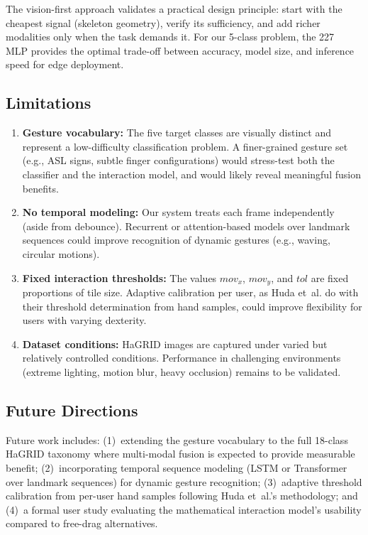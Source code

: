\documentclass[11pt,a4paper]{article}
\begin{document}
The vision-first approach validates a practical design principle: start with the cheapest signal (skeleton geometry), verify its sufficiency, and add richer modalities only when the task demands it. For our 5-class problem, the \SI{227}{\kilo\byte} MLP provides the optimal trade-off between accuracy, model size, and inference speed for edge deployment.

\subsection{Limitations}

\begin{enumerate}
    \item \textbf{Gesture vocabulary:} The five target classes are visually distinct and represent a low-difficulty classification problem. A finer-grained gesture set (e.g., ASL signs, subtle finger configurations) would stress-test both the classifier and the interaction model, and would likely reveal meaningful fusion benefits.
    \item \textbf{No temporal modeling:} Our system treats each frame independently (aside from debounce). Recurrent or attention-based models over landmark sequences could improve recognition of dynamic gestures (e.g., waving, circular motions).
    \item \textbf{Fixed interaction thresholds:} The values $mov_x$, $mov_y$, and $tol$ are fixed proportions of tile size. Adaptive calibration per user, as Huda et~al. do with their threshold determination from hand samples, could improve flexibility for users with varying dexterity.
    \item \textbf{Dataset conditions:} HaGRID images are captured under varied but relatively controlled conditions. Performance in challenging environments (extreme lighting, motion blur, heavy occlusion) remains to be validated.
\end{enumerate}

\subsection{Future Directions}

Future work includes: (1)~extending the gesture vocabulary to the full 18-class HaGRID taxonomy where multi-modal fusion is expected to provide measurable benefit; (2)~incorporating temporal sequence modeling (LSTM or Transformer over landmark sequences) for dynamic gesture recognition; (3)~adaptive threshold calibration from per-user hand samples following Huda et~al.'s methodology; and (4)~a formal user study evaluating the mathematical interaction model's usability compared to free-drag alternatives.
\end{document}
